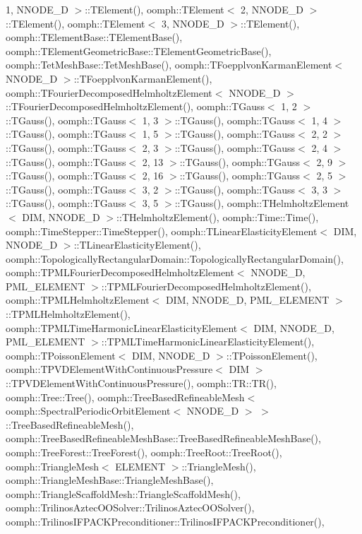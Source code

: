 1, N\+N\+O\+D\+E\+\_\+D $>$\+::\+T\+Element(), oomph\+::\+T\+Element$<$ 2, N\+N\+O\+D\+E\+\_\+D $>$\+::\+T\+Element(), oomph\+::\+T\+Element$<$ 3, N\+N\+O\+D\+E\+\_\+D $>$\+::\+T\+Element(), oomph\+::\+T\+Element\+Base\+::\+T\+Element\+Base(), oomph\+::\+T\+Element\+Geometric\+Base\+::\+T\+Element\+Geometric\+Base(), oomph\+::\+Tet\+Mesh\+Base\+::\+Tet\+Mesh\+Base(), oomph\+::\+T\+Foepplvon\+Karman\+Element$<$ N\+N\+O\+D\+E\+\_\+D $>$\+::\+T\+Foepplvon\+Karman\+Element(), oomph\+::\+T\+Fourier\+Decomposed\+Helmholtz\+Element$<$ N\+N\+O\+D\+E\+\_\+D $>$\+::\+T\+Fourier\+Decomposed\+Helmholtz\+Element(), oomph\+::\+T\+Gauss$<$ 1, 2 $>$\+::\+T\+Gauss(), oomph\+::\+T\+Gauss$<$ 1, 3 $>$\+::\+T\+Gauss(), oomph\+::\+T\+Gauss$<$ 1, 4 $>$\+::\+T\+Gauss(), oomph\+::\+T\+Gauss$<$ 1, 5 $>$\+::\+T\+Gauss(), oomph\+::\+T\+Gauss$<$ 2, 2 $>$\+::\+T\+Gauss(), oomph\+::\+T\+Gauss$<$ 2, 3 $>$\+::\+T\+Gauss(), oomph\+::\+T\+Gauss$<$ 2, 4 $>$\+::\+T\+Gauss(), oomph\+::\+T\+Gauss$<$ 2, 13 $>$\+::\+T\+Gauss(), oomph\+::\+T\+Gauss$<$ 2, 9 $>$\+::\+T\+Gauss(), oomph\+::\+T\+Gauss$<$ 2, 16 $>$\+::\+T\+Gauss(), oomph\+::\+T\+Gauss$<$ 2, 5 $>$\+::\+T\+Gauss(), oomph\+::\+T\+Gauss$<$ 3, 2 $>$\+::\+T\+Gauss(), oomph\+::\+T\+Gauss$<$ 3, 3 $>$\+::\+T\+Gauss(), oomph\+::\+T\+Gauss$<$ 3, 5 $>$\+::\+T\+Gauss(), oomph\+::\+T\+Helmholtz\+Element$<$ D\+I\+M, N\+N\+O\+D\+E\+\_\+D $>$\+::\+T\+Helmholtz\+Element(), oomph\+::\+Time\+::\+Time(), oomph\+::\+Time\+Stepper\+::\+Time\+Stepper(), oomph\+::\+T\+Linear\+Elasticity\+Element$<$ D\+I\+M, N\+N\+O\+D\+E\+\_\+D $>$\+::\+T\+Linear\+Elasticity\+Element(), oomph\+::\+Topologically\+Rectangular\+Domain\+::\+Topologically\+Rectangular\+Domain(), oomph\+::\+T\+P\+M\+L\+Fourier\+Decomposed\+Helmholtz\+Element$<$ N\+N\+O\+D\+E\+\_\+D, P\+M\+L\+\_\+\+E\+L\+E\+M\+E\+N\+T $>$\+::\+T\+P\+M\+L\+Fourier\+Decomposed\+Helmholtz\+Element(), oomph\+::\+T\+P\+M\+L\+Helmholtz\+Element$<$ D\+I\+M, N\+N\+O\+D\+E\+\_\+D, P\+M\+L\+\_\+\+E\+L\+E\+M\+E\+N\+T $>$\+::\+T\+P\+M\+L\+Helmholtz\+Element(), oomph\+::\+T\+P\+M\+L\+Time\+Harmonic\+Linear\+Elasticity\+Element$<$ D\+I\+M, N\+N\+O\+D\+E\+\_\+D, P\+M\+L\+\_\+\+E\+L\+E\+M\+E\+N\+T $>$\+::\+T\+P\+M\+L\+Time\+Harmonic\+Linear\+Elasticity\+Element(), oomph\+::\+T\+Poisson\+Element$<$ D\+I\+M, N\+N\+O\+D\+E\+\_\+D $>$\+::\+T\+Poisson\+Element(), oomph\+::\+T\+P\+V\+D\+Element\+With\+Continuous\+Pressure$<$ D\+I\+M $>$\+::\+T\+P\+V\+D\+Element\+With\+Continuous\+Pressure(), oomph\+::\+T\+R\+::\+T\+R(), oomph\+::\+Tree\+::\+Tree(), oomph\+::\+Tree\+Based\+Refineable\+Mesh$<$ oomph\+::\+Spectral\+Periodic\+Orbit\+Element$<$ N\+N\+O\+D\+E\+\_\+D $>$ $>$\+::\+Tree\+Based\+Refineable\+Mesh(), oomph\+::\+Tree\+Based\+Refineable\+Mesh\+Base\+::\+Tree\+Based\+Refineable\+Mesh\+Base(), oomph\+::\+Tree\+Forest\+::\+Tree\+Forest(), oomph\+::\+Tree\+Root\+::\+Tree\+Root(), oomph\+::\+Triangle\+Mesh$<$ E\+L\+E\+M\+E\+N\+T $>$\+::\+Triangle\+Mesh(), oomph\+::\+Triangle\+Mesh\+Base\+::\+Triangle\+Mesh\+Base(), oomph\+::\+Triangle\+Scaffold\+Mesh\+::\+Triangle\+Scaffold\+Mesh(), oomph\+::\+Trilinos\+Aztec\+O\+O\+Solver\+::\+Trilinos\+Aztec\+O\+O\+Solver(), oomph\+::\+Trilinos\+I\+F\+P\+A\+C\+K\+Preconditioner\+::\+Trilinos\+I\+F\+P\+A\+C\+K\+Preconditioner(), 
